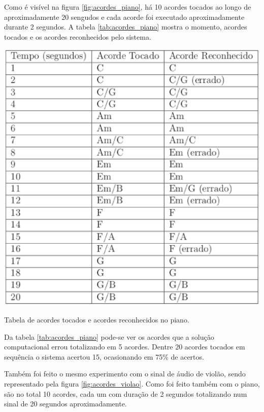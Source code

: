 Como é visível na figura \ref{fig:acordes_piano}, há 10 acordes tocados ao longo de aproximadamente 20 sengudos e cada acorde foi executado aproximadamente durante 2 segundos. A tabela \ref{tab:acordes_piano} mostra o momento, acordes tocados e os acordes reconhecidos pelo sistema.

\begin{table}[h]
\centering
    \includegraphics[keepaspectratio=true,scale=0.5]{figuras/tabela_acordes_piano.eps}
  \caption{Tabela de acordes tocados e acordes reconhecidos no piano.}
  \label{tab:acordes_piano}
\end{table}

Da tabela \ref{tab:acordes_piano} pode-se ver os acordes que a solução computacional errou totalizando em 5 acordes. Dentre 20 acordes tocados em sequência o sistema acertou 15, ocasionando em 75\% de acertos.

Também foi feito o mesmo experimento com o sinal de áudio de violão, sendo representado pela figura \ref{fig:acordes_violao}. Como foi feito também com o piano, são no total 10 acordes, cada um com duração de 2 segundos totalizando num sinal de 20 segundos aproximadamente.

